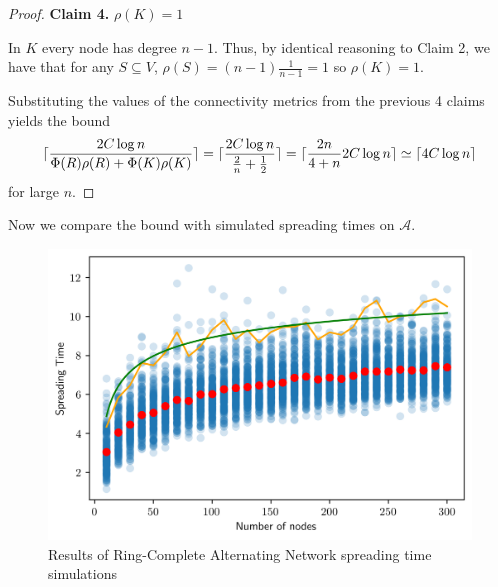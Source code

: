\begin{proof}
\textbf{Claim 4.}  $\rho(K)=1$

In $K$ every node has degree $n - 1$. Thus, by identical reasoning to Claim 2, we have that for any $S \subseteq V$, $\rho(S) = (n-1)\frac{1}{n-1} = 1$ so $\rho(K) = 1$.

Substituting the values of the connectivity metrics from the previous 4 claims yields the bound
$$ %
	\ceil{\frac{2C \log n}{\Phi(R)\rho(R) + \Phi(K)\rho(K)}} = \ceil{\frac{2C \log n}{\frac{2}{n} + \frac{1}{2}}}
	= \ceil{\frac{2n}{4+n} 2C\log n}
	\simeq \ceil{4C \log n}
$$
for large $n$.

\end{proof}



Now we compare the bound with simulated spreading times on $\mathcal{A}$.

\begin{figure}[h]
	\centering
	\includegraphics[width=1\textwidth]{./figures/alternating_ring_simulation_results.png}
	\caption{Results of Ring-Complete Alternating Network spreading time simulations}
	\label{fig:alternatingSimResults}
\end{figure}

